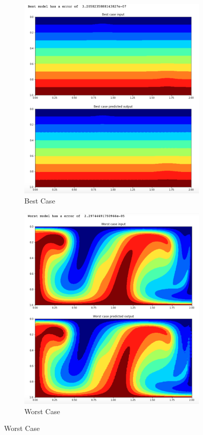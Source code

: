 \begin{figure}[H]
\centering
\begin{subfigure}{0.45\textwidth}
    \includegraphics[width=\textwidth]{figures/mantle_convection_images/larger_dataset/ConvAE_Best.png}
    \caption{Best Case}
    \label{fig:first}
\end{subfigure}
\hfill
\begin{subfigure}{0.45\textwidth}
    \includegraphics[width=\textwidth]{figures/mantle_convection_images/larger_dataset/ConvAE_Worst.png}
    \caption{Worst Case}
    \label{fig:second}
\end{subfigure}
        

\end{figure}
